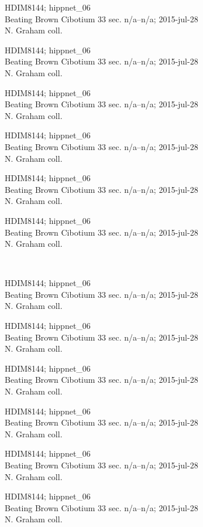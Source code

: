 \documentclass[2pt]{extarticle}
\begin{document}
\noindent
\parbox{0.16\textwidth}{\tiny \raggedright \rule[-0.3\baselineskip]{0pt}{10pt}HDIM8144; hippnet\_06\\ Beating Brown Cibotium 33 sec. n/a--n/a; 2015-jul-28\\ N. Graham coll.}
\parbox{0.16\textwidth}{\tiny \raggedright \rule[-0.3\baselineskip]{0pt}{10pt}HDIM8144; hippnet\_06\\ Beating Brown Cibotium 33 sec. n/a--n/a; 2015-jul-28\\ N. Graham coll.}
\parbox{0.16\textwidth}{\tiny \raggedright \rule[-0.3\baselineskip]{0pt}{10pt}HDIM8144; hippnet\_06\\ Beating Brown Cibotium 33 sec. n/a--n/a; 2015-jul-28\\ N. Graham coll.}
\parbox{0.16\textwidth}{\tiny \raggedright \rule[-0.3\baselineskip]{0pt}{10pt}HDIM8144; hippnet\_06\\ Beating Brown Cibotium 33 sec. n/a--n/a; 2015-jul-28\\ N. Graham coll.}
\parbox{0.16\textwidth}{\tiny \raggedright \rule[-0.3\baselineskip]{0pt}{10pt}HDIM8144; hippnet\_06\\ Beating Brown Cibotium 33 sec. n/a--n/a; 2015-jul-28\\ N. Graham coll.}
\parbox{0.16\textwidth}{\tiny \raggedright \rule[-0.3\baselineskip]{0pt}{10pt}HDIM8144; hippnet\_06\\ Beating Brown Cibotium 33 sec. n/a--n/a; 2015-jul-28\\ N. Graham coll.} \\ 
\vspace{0.001in} 

\noindent
\parbox{0.16\textwidth}{\tiny \raggedright \rule[-0.3\baselineskip]{0pt}{10pt}HDIM8144; hippnet\_06\\ Beating Brown Cibotium 33 sec. n/a--n/a; 2015-jul-28\\ N. Graham coll.}
\parbox{0.16\textwidth}{\tiny \raggedright \rule[-0.3\baselineskip]{0pt}{10pt}HDIM8144; hippnet\_06\\ Beating Brown Cibotium 33 sec. n/a--n/a; 2015-jul-28\\ N. Graham coll.}
\parbox{0.16\textwidth}{\tiny \raggedright \rule[-0.3\baselineskip]{0pt}{10pt}HDIM8144; hippnet\_06\\ Beating Brown Cibotium 33 sec. n/a--n/a; 2015-jul-28\\ N. Graham coll.}
\parbox{0.16\textwidth}{\tiny \raggedright \rule[-0.3\baselineskip]{0pt}{10pt}HDIM8144; hippnet\_06\\ Beating Brown Cibotium 33 sec. n/a--n/a; 2015-jul-28\\ N. Graham coll.}
\parbox{0.16\textwidth}{\tiny \raggedright \rule[-0.3\baselineskip]{0pt}{10pt}HDIM8144; hippnet\_06\\ Beating Brown Cibotium 33 sec. n/a--n/a; 2015-jul-28\\ N. Graham coll.}
\parbox{0.16\textwidth}{\tiny \raggedright \rule[-0.3\baselineskip]{0pt}{10pt}HDIM8144; hippnet\_06\\ Beating Brown Cibotium 33 sec. n/a--n/a; 2015-jul-28\\ N. Graham coll.} \\ 
\vspace{0.001in} 
\end{document}
